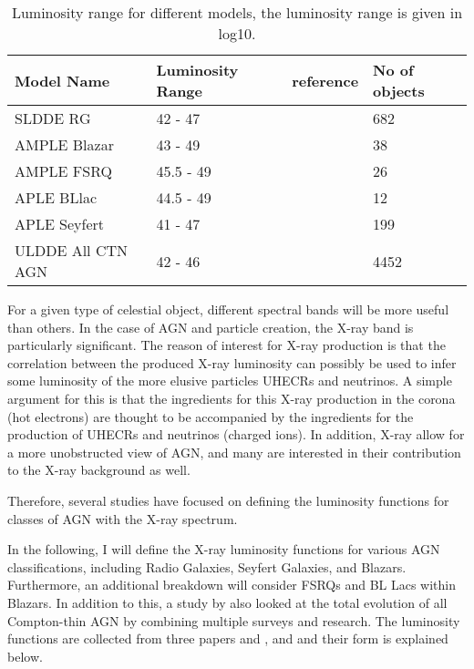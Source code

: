 \begin{table}
    \centering
    \begin{tabular}{llll}
        \hline
        Model Name   & Luminosity Range  & reference &No of objects \\
        \hline
        SLDDE RG     & 42 - 47      & \cite{Silverman_2008} &  682    \\
        AMPLE Blazar & 43 - 49       & \cite{Ajello_2009}&  38 \\
        AMPLE FSRQ   & 45.5 - 49      &\cite{Ajello_2009}&  26  \\
        APLE BLlac   & 44.5 - 49      &\cite{Ajello_2009}& 12 \\
        APLE Seyfert & 41 - 47       &\cite{Ajello_2009}&  199 \\
        ULDDE All CTN AGN & 42 - 46 &\cite{Ueda_2014}& 4452\\
        \hline

    \end{tabular}
    \caption{Luminosity range for different models, the luminosity range is given in log10.}

    \label{tab:lum_range}

\end{table}



For a given type of celestial object, different spectral bands will be more useful than others. In the case of AGN and particle creation, 
the X-ray band is particularly significant. The reason of interest for X-ray production is that the correlation between the produced X-ray luminosity can possibly be used to infer some luminosity of the more elusive 
particles UHECRs and neutrinos. A simple argument for this is that the ingredients for this X-ray production in the corona (hot electrons) are thought to be accompanied by the ingredients for the production of UHECRs and neutrinos (charged ions).
In addition, X-ray allow for a more unobstructed view of AGN, and many are interested in their contribution to the X-ray background as well.

Therefore, several studies have focused on defining the luminosity functions for classes of AGN with the X-ray spectrum.

In the following, I will define the X-ray luminosity functions for various AGN classifications, including Radio Galaxies, Seyfert Galaxies, and Blazars. Furthermore, an additional breakdown will consider FSRQs and BL Lacs within Blazars.  In addition to this, 
a study by \cite{Ueda_2014} also looked at the total evolution of all Compton-thin AGN by combining multiple surveys and research. The luminosity functions are collected from three papers \cite{Ajello_2009} and \cite{Silverman_2008}, and \cite{Ueda_2014} and their form is explained below.

